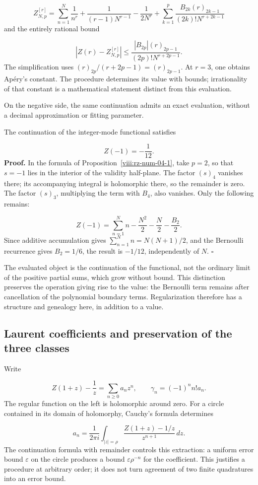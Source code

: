 \[
Z_{N,p}^{[r]}=
\sum_{n=1}^N\frac1{n^r}+\frac1{(r-1)N^{r-1}}-\frac1{2N^r}
+\sum_{k=1}^p\frac{B_{2k}(r)_{2k-1}}{(2k)!N^{r+2k-1}}
\]
and the entirely rational bound

\[
\left|Z(r)-Z_{N,p}^{[r]}\right|
\leq\frac{|B_{2p}|(r)_{2p-1}}{(2p)!N^{r+2p-1}}.
\]
The simplification uses \((r)_{2p}/(r+2p-1)=(r)_{2p-1}\). At \(r=3\), one obtains Apéry's constant. The procedure determines its value with bounds; irrationality of that constant is a mathematical statement distinct from this evaluation.

On the negative side, the same continuation admits an exact evaluation, without a decimal approximation or fitting parameter.

The continuation of the integer-mode functional satisfies

\[
Z(-1)=-\frac1{12}.
\]
\textbf{Proof.} In the formula of Proposition~\ref{viii:rz-num-04-1}, take \(p=2\), so that \(s=-1\) lies in the interior of the validity half-plane. The factor \((s)_4\) vanishes there; its accompanying integral is holomorphic there, so the remainder is zero. The factor \((s)_3\), multiplying the term with \(B_4\), also vanishes. Only the following remains:

\[
Z(-1)=\sum_{n=1}^N n-\frac{N^2}{2}-\frac N2-\frac{B_2}{2}.
\]
Since additive accumulation gives \(\sum_{n=1}^N n=N(N+1)/2\), and the Bernoulli recurrence gives \(B_2=1/6\), the result is \(-1/12\), independently of \(N\). \hfill\(\square\)

The evaluated object is the continuation of the functional, not the ordinary limit of the positive partial sums, which grow without bound. This distinction preserves the operation giving rise to the value: the Bernoulli term remains after cancellation of the polynomial boundary terms. Regularization therefore has a structure and genealogy here, in addition to a value.

\subsection{Laurent coefficients and preservation of the three classes}
Write

\[
Z(1+z)-\frac1z=\sum_{n\geq0}a_nz^n,
\qquad \gamma_n=(-1)^nn!a_n.
\]
The regular function on the left is holomorphic around zero. For a circle contained in its domain of holomorphy, Cauchy's formula determines

\[
a_n=\frac1{2\pi i}\int_{|z|=\rho}
\frac{Z(1+z)-1/z}{z^{n+1}}\,dz.
\]
The continuation formula with remainder controls this extraction: a uniform error bound \(\varepsilon\) on the circle produces a bound \(\varepsilon\rho^{-n}\) for the coefficient. This justifies a procedure at arbitrary order; it does not turn agreement of two finite quadratures into an error bound.

